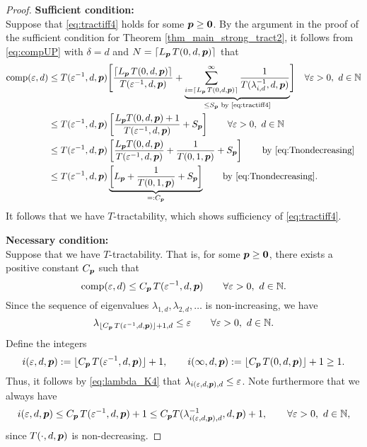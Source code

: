 \documentclass[sort&compress]{elsarticle}
\newcommand{\thed}{\delta}
\begin{document}
\begin{proof}
    \textbf{Sufficient condition:}\\
Suppose that \eqref{eq:tractiff4} holds for some $\boldsymbol{p} \ge \boldsymbol{0}$. 
By the argument in the proof of the sufficient condition for Theorem \ref{thm_main_strong_tract2}, it follows from \eqref{eq:compUP} with $\thed=d$ and $N = \lceil L_{\boldsymbol{p}}\, T(0,d,\boldsymbol{p})\rceil$ that 
\begin{align*}
       \operatorname{comp}(\varepsilon,d)
       & \le T(\varepsilon^{-1},d,\boldsymbol{p}) \Biggl [ 
       \frac{\lceil L_{\boldsymbol{p}}\, T(0,d,\boldsymbol{p})\rceil}{T(\varepsilon^{-1},d,\boldsymbol{p})}  + 
       \underbrace{\sum_{i=\lceil L_{\boldsymbol{p}}\, T(0,d,\boldsymbol{p})\rceil}^\infty \frac{1}{T(\lambda_{i, d}^{-1},d,\boldsymbol{p})}}_{\le S_{\boldsymbol{p}} \text{ by \eqref{eq:tractiff4}}}
       \Biggr ] 
        \quad \forall \varepsilon > 0, \ d  \in \mathbb{N}\\
       & \le T(\varepsilon^{-1},d,\boldsymbol{p})\left[\frac{L_{\boldsymbol{p}} T(0,d,\boldsymbol{p})+1}{T(\varepsilon^{-1},d, \boldsymbol{p})} +  S_{\boldsymbol{p}} \right]
        \qquad \forall \varepsilon > 0, \ d  \in \mathbb{N}\\
       & \le T(\varepsilon^{-1},d,\boldsymbol{p})\left[\frac{L_{\boldsymbol{p}} T(0,d,\boldsymbol{p})}{T(\varepsilon^{-1},d, \boldsymbol{p})}
       + \frac{1}{T(0,1, \boldsymbol{p})} + S_{\boldsymbol{p}}\right]
       \qquad \text{by \eqref{eq:Tnondecreasing}}   \\
       & \le T(\varepsilon^{-1},d,\boldsymbol{p}) 
       \underbrace{\left [  L_{\boldsymbol{p}} + \frac{1}{T(0,1, \boldsymbol{p})} + S_{\boldsymbol{p}} \right]}_{=:C_{\boldsymbol{p}}}
       \qquad \text{by \eqref{eq:Tnondecreasing}} .
\end{align*}
It follows that we have $T$-tractability, which shows sufficiency of \eqref{eq:tractiff4}.

\bigskip

\noindent \textbf{Necessary condition:}\\
Suppose that we have
$T$-tractability. That is, for some $\boldsymbol{p} \ge \boldsymbol{0}$, there exists a positive constant $C_{\boldsymbol{p}}$ such that
\[
\operatorname{comp}(\varepsilon,d)\le C_{\boldsymbol{p}}\, T(\varepsilon^{-1},d,\boldsymbol{p}) \qquad \forall \varepsilon > 0,  \ d \in \mathbb{N}.
\]
Since the sequence of eigenvalues $\lambda_{1,d}, \lambda_{2,d}, \ldots $ is non-increasing, we have
\begin{equation}\label{eq:lambda_K4}
	\lambda_{\lfloor C_{\boldsymbol{p}}\, T(\varepsilon^{-1},d,\boldsymbol{p})\rfloor +1,d}\le \varepsilon \qquad \forall \varepsilon > 0,  \ d \in \mathbb{N}.
\end{equation}
Define the integers
\[
i (\varepsilon,d,\boldsymbol{p}):= \lfloor C_{\boldsymbol{p}}\, T(\varepsilon^{-1},d,\boldsymbol{p})\rfloor +1, \qquad
i (\infty,d,\boldsymbol{p}) := \lfloor C_{\boldsymbol{p}}\, T(0,d,\boldsymbol{p})\rfloor +1 \ge 1.
\]
Thus, it follows by \eqref{eq:lambda_K4} that $\lambda_{i(\varepsilon,d,\boldsymbol{p}),d} \le \varepsilon$.
Note furthermore that we always have
\[
i(\varepsilon,d,\boldsymbol{p})\le C_{\boldsymbol{p}}\, T(\varepsilon^{-1},d,\boldsymbol{p})+1 \le C_{\boldsymbol{p}} T(\lambda_{i(\varepsilon,d,\boldsymbol{p}),d}^{-1},d,\boldsymbol{p})+1, \qquad \forall \varepsilon > 0, \ d \in \mathbb{N},
\]
since
$T(\cdot,d,\boldsymbol{p})$ is non-decreasing.


\end{proof}
\end{document}
